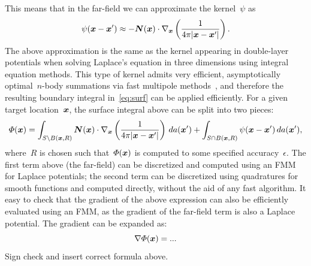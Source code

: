\documentclass[11pt]{article}
\numberwithin{equation}{section}
\newcommand{\vct}{\vectorsym}
\DeclareMathOperator\erf{Erf}
\newcommand\bx{\vct{x}}
\newcommand\by{\vct{y}}
\newcommand\bn{\boldsymbol n}
\begin{document}
This means that in the far-field we can approximate the kernel~$\psi$ as
\begin{equation}
  \psi(\bx-\bx') \approx -\vct{N}(\bx) \cdot \nabla_{\bx} \left(
    \frac{1}{4\pi |\bx-\bx'| }\right).
\end{equation}
The above approximation is the same as the kernel appearing in
double-layer potentials when solving Laplace's equation in three
dimensions using integral equation methods. This type of kernel admits
very efficient, asymptotically optimal~$n$-body summations via fast
multipole methods~\cite{greengard-1997}, and therefore the resulting
boundary integral in~\eqref{eq:surf} can be applied efficiently.  For
a given target location~$\bx$, the surface integral above can be split
into two pieces:
\begin{equation}
  \Phi(\bx) = \int_{S\setminus B(\bx,R)} \vct{N}(\bx) \cdot \nabla_{\bx} \left(
    \frac{1}{4\pi |\bx-\bx'| }\right) \, da(\bx') +
  \int_{S \cap B(\bx,R)} \psi(\bx-\bx') \, da(\bx'),
\end{equation}
where~$R$ is chosen such that~$\Phi(\bx)$ is computed to some
specified accuracy~$\epsilon$. The first term above (the far-field)
can be discretized and computed using an FMM for Laplace potentials;
the second term can be discretized using quadratures for smooth
functions and computed directly, without the aid of any fast algorithm.
It easy to check that the gradient of the above expression can also be
efficiently evaluated using an FMM, as the gradient of the far-field
term is also a Laplace potential. The gradient can be expanded as:
\begin{equation}\label{eq:surfgrad}
    \nabla \Phi(\bx) =  ...
\end{equation}
{\color{red} Sign check and insert correct formula above.}
\end{document}
